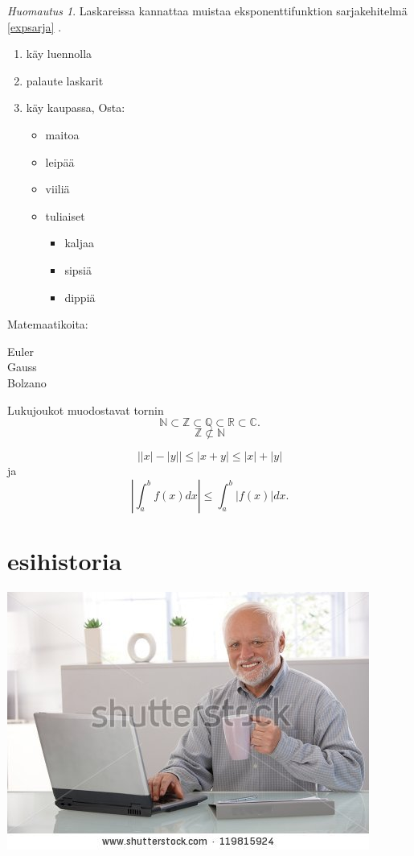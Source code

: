 \documentclass[a4paper]{article}
\theoremstyle{definition}
\theoremstyle{remark}
\newtheorem*{huom}{Huomautus}
\newcommand{\R}{\mathbb{R}}
\newcommand{\Z}{\mathbb{Z}}
\newcommand{\Q}{\mathbb{Q}}
\newcommand{\N}{\mathbb{N}}
\newcommand{\C}{\mathbb{C}}
\newcommand{\abs}[1]{\left| #1 \right|}
\begin{document}
\begin{huom}
Laskareissa kannattaa muistaa eksponenttifunktion sarjakehitelmä \eqref{expsarja} \pageref{expsarja}.
\end{huom}

\begin{enumerate}
\item käy luennolla
\item palaute laskarit
\item käy kaupassa, Osta:	
	\begin{itemize}
		\item maitoa
		\item leipää
		\item viiliä
		\item tuliaiset
		\begin{itemize}
			\item kaljaa
			\item sipsiä
			\item dippiä
		\end{itemize}
	\end{itemize}
\end{enumerate}

Matemaatikoita:
\begin{description}
	\item[Euler]
	\item[Gauss]
	\item[Bolzano]
\end{description}

Lukujoukot muodostavat tornin
\[
\N \subset \Z \subset \Q \subset \R \subset \C .
\] \[
\Z \not\subset \N
\]

\[
\abs{\abs{x} - \abs{y}} \leq \abs{x+y} \leq \abs{x} + \abs{y}
\] ja \[
\abs{\int_a^b f(x)dx} \leq \int_a^b \abs{f(x)} dx .
\]

\section{esihistoria}

\includegraphics[scale=1.5]{OldGuy}
\end{document}
